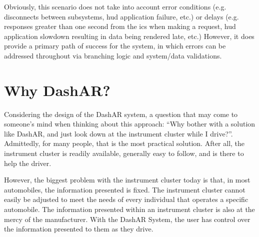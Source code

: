     \par Obviously, this scenario does not take into account error conditions (e.g. disconnects between subsystems, \gls{hud} application failure, etc.) or delays (e.g. responses greater than one second from the \gls{ics} when making a request, \gls{hud} application slowdown resulting in data being rendered late, etc.) However, it does provide a primary path of success for the system, in which errors can be addressed throughout via branching logic and system/data validations.

\section{Why DashAR?}
    \par Considering the design of the DashAR system, a question that may come to someone's mind when thinking about this approach: ``Why bother with a solution like DashAR, and just look down at the instrument cluster while I drive?''. Admittedly, for many people, that is the most practical solution. After all, the instrument cluster is readily available, generally easy to follow, and is there to help the driver.

    \par However, the biggest problem with the instrument cluster today is that, in most automobiles, the information presented is fixed. The instrument cluster cannot easily be adjusted to meet the needs of every individual that operates a specific automobile. The information presented within an instrument cluster is also at the mercy of the manufacturer. With the DashAR System, the user has control over the information presented to them as they drive.
